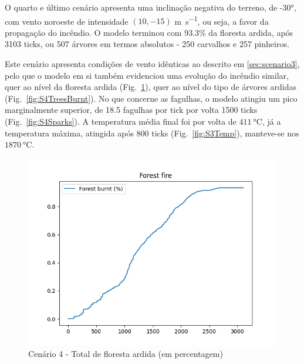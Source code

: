 O quarto e último cenário apresenta uma inclinação negativa do terreno, de \ang{-30}, com vento noroeste de intensidade $(10, -15)$ \si{\meter\per\second}, ou seja, a favor da propagação do incêndio. O modelo terminou com 93.3\% da floresta ardida, após 3103 ticks, ou 507 árvores em termos absolutos - 250 carvalhos e 257 pinheiros.

Este cenário apresenta condições de vento idênticas ao descrito em \ref{sec:scenario3}, pelo que o modelo em si também evidenciou uma evolução do incêndio similar, quer ao nível da floresta ardida (Fig.~\ref{fig:S4ForestBurnt}), quer ao nível do tipo de árvores ardidas (Fig.~\ref{fig:S4TreesBurnt}). No que concerne as fagulhas, o modelo atingiu um pico marginalmente superior, de 18.5 fagulhas por tick por volta 
1500 ticks (Fig.~\ref{fig:S4Sparks}). A temperatura média final foi por volta de $\SI{411}{\degreeCelsius}$, já a temperatura máxima, atingida após 800 ticks (Fig.~\ref{fig:S3Temp}), manteve-se nos $\SI{1870}{\degreeCelsius}$.

\begin{figure}[H]
    \centering
    \includegraphics[width=\textwidth]{src/runs/scenario4/forest_fire.png}
    \caption{Cenário 4 - Total de floresta ardida (em percentagem)}
    \label{fig:S4ForestBurnt}
\end{figure}

